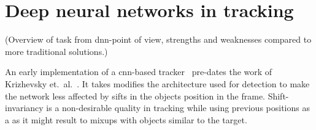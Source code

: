 \section{Deep neural networks in tracking}
(Overview of task from \ac{dnn}-point of view, strengths and weaknesses compared to
more traditional solutions.)

An early implementation of a \ac{cnn}-based tracker~\cite{HUMAN_CNN} pre-dates the work
of Krizhevsky et.~al.~\cite{NIPS_IMAGENET}. It takes modifies the architecture used for
detection to make the network less affected by sifts in the objects position in the
frame. Shift-invariancy is a non-desirable quality in tracking while using previous
positions as a as it might result to mixups with objects similar to the target.~\cite{HUMAN_CNN}
